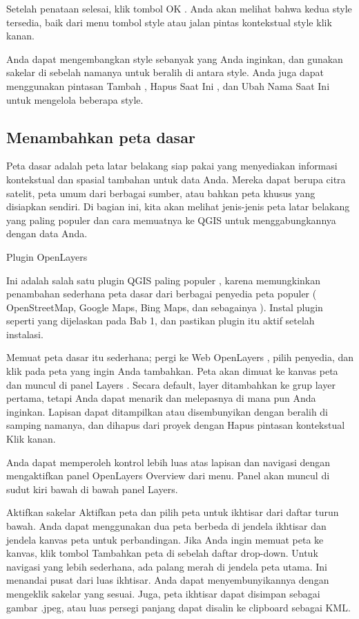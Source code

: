 \documentclass[]{book}
\begin{document}
Setelah penataan selesai, klik tombol OK . Anda akan melihat bahwa kedua style tersedia, baik dari menu tombol style atau jalan pintas kontekstual style klik kanan.

Anda dapat mengembangkan style sebanyak yang Anda inginkan, dan gunakan sakelar di sebelah namanya untuk beralih di antara style. Anda juga dapat menggunakan pintasan Tambah , Hapus Saat Ini , dan Ubah Nama Saat Ini untuk mengelola beberapa style.

\hypertarget{menambahkan-peta-dasar}{%
\subsection{Menambahkan peta dasar}\label{menambahkan-peta-dasar}}

Peta dasar adalah peta latar belakang siap pakai yang menyediakan informasi kontekstual dan spasial tambahan untuk data Anda. Mereka dapat berupa citra satelit, peta umum dari berbagai sumber, atau bahkan peta khusus yang disiapkan sendiri. Di bagian ini, kita akan melihat jenis-jenis peta latar belakang yang paling populer dan cara memuatnya ke QGIS untuk menggabungkannya dengan data Anda.

Plugin OpenLayers

Ini adalah salah satu plugin QGIS paling populer , karena memungkinkan penambahan sederhana peta dasar dari berbagai penyedia peta populer ( OpenStreetMap, Google Maps, Bing Maps, dan sebagainya ). Instal plugin seperti yang dijelaskan pada Bab 1, dan pastikan plugin itu aktif setelah instalasi.

Memuat peta dasar itu sederhana; pergi ke Web \textbar{} OpenLayers , pilih penyedia, dan klik pada peta yang ingin Anda tambahkan. Peta akan dimuat ke kanvas peta dan muncul di panel Layers . Secara default, layer ditambahkan ke grup layer pertama, tetapi Anda dapat menarik dan melepasnya di mana pun Anda inginkan. Lapisan dapat ditampilkan atau disembunyikan dengan beralih di samping namanya, dan dihapus dari proyek dengan Hapus pintasan kontekstual Klik kanan.

Anda dapat memperoleh kontrol lebih luas atas lapisan dan navigasi dengan mengaktifkan panel OpenLayers Overview dari menu. Panel akan muncul di sudut kiri bawah di bawah panel Layers.

Aktifkan sakelar Aktifkan peta dan pilih peta untuk ikhtisar dari daftar turun bawah. Anda dapat menggunakan dua peta berbeda di jendela ikhtisar dan jendela kanvas peta untuk perbandingan. Jika Anda ingin memuat peta ke kanvas, klik tombol Tambahkan peta di sebelah daftar drop-down. Untuk navigasi yang lebih sederhana, ada palang merah di jendela peta utama. Ini menandai pusat dari luas ikhtisar. Anda dapat menyembunyikannya dengan mengeklik sakelar yang sesuai. Juga, peta ikhtisar dapat disimpan sebagai gambar .jpeg, atau luas persegi panjang dapat disalin ke clipboard sebagai KML.
\end{document}
